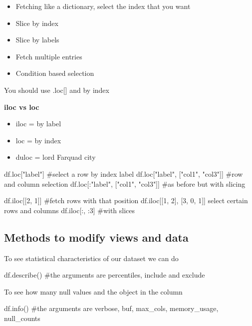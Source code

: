 \begin{itemize}
    \item Fetching like a dictionary, select the index that you want
    \item Slice by index
    \item Slice by labels
    \item Fetch multiple entries
    \item Condition based selection
\end{itemize}

\vspace{10pt}

You should use .loc[] and by index

\vspace{10pt}

\textbf{iloc vs loc}

\begin{itemize}
    \item iloc = by label
    \item loc = by index
    \item duloc = lord Farquad city
\end{itemize}


\begin{pythoncode}
    df.loc["label"] #select a row by index label
    df.loc["label", ["col1", "col3"]] #row and column selection
    df.loc[:"label", ["col1", "col3"]] #as before but with slicing

    df.iloc[[2, 1]] #fetch rows with that position
    df.iloc[[1, 2], [3, 0, 1]] select certain rows and columns
    df.iloc[:, :3] #with slices
\end{pythoncode}

\subsection{Methods to modify views and data}

To see statistical characteristics of our dataset we can do

\begin{pythoncode}
    df.describe() #the arguments are percentiles, include and exclude
\end{pythoncode}


To see how many null values and the object in the column

\begin{pythoncode}
    df.info() #the arguments are verbose, buf, max_cols, memory_usage, null_counts
\end{pythoncode}

